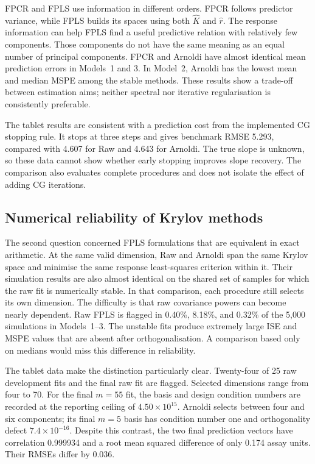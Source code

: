 FPCR and FPLS use information in different orders.  FPCR follows predictor
variance, while FPLS builds its spaces using both $\widehat K$ and
$\widehat r$.  The response information can help FPLS find a useful
predictive relation with relatively few components.  Those components do
not have the same meaning as an equal number of principal components.
FPCR and Arnoldi have almost identical mean prediction errors in Models~1
and 3.  In Model~2, Arnoldi has the lowest mean and median MSPE among the
stable methods.  These results show a trade-off between estimation aims;
neither spectral nor iterative regularisation is consistently preferable.

The tablet results are consistent with a prediction cost from the
implemented CG stopping rule.  It stops at three steps and gives benchmark
RMSE 5.293, compared with 4.607 for Raw and 4.643 for Arnoldi.  The true
slope is unknown, so these data cannot show whether early stopping improves
slope recovery.  The comparison also evaluates complete procedures and
does not isolate the effect of adding CG iterations.

\subsection{Numerical reliability of Krylov methods}

The second question concerned FPLS formulations that are equivalent in
exact arithmetic.  At the same valid dimension, Raw and Arnoldi span the
same Krylov space and minimise the same response least-squares criterion
within it.  Their simulation results are also almost identical on the
shared set of samples for which the raw fit is numerically stable.
In that comparison, each procedure still selects its own dimension.
The difficulty is that raw covariance powers can become nearly dependent.
Raw FPLS is flagged in 0.40\%, 8.18\%, and 0.32\% of the 5,000 simulations
in Models~1--3.  The unstable fits produce extremely large ISE and MSPE
values that are absent after orthogonalisation.  A comparison based only
on medians would miss this difference in reliability.

The tablet data make the distinction particularly clear.  Twenty-four of
25 raw development fits and the final raw fit are flagged.  Selected
dimensions range from four to 70.  For the final $m=55$ fit, the basis
and design condition numbers are recorded at the reporting ceiling of
$4.50\times10^{15}$.  Arnoldi selects between four and six components;
its final $m=5$ basis has condition number one and orthogonality defect
$7.4\times10^{-16}$.  Despite this contrast, the two final prediction
vectors have correlation 0.999934 and a root mean squared difference of
only 0.174 assay units.  Their RMSEs differ by 0.036.

